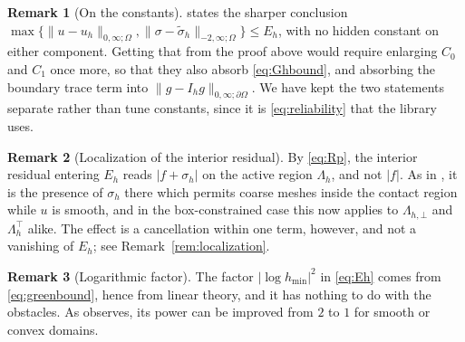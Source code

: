 \documentclass[12pt]{amsart}
\theoremstyle{definition}
\newtheorem{remark}{Remark}
\newcommand{\Om}{\Omega}
\newcommand{\dOm}{\partial\Omega}
\newcommand{\Ih}{I_h}
\newcommand{\Lamh}{\Lambda_h}
\newcommand{\Lamhbot}{\Lambda_{h,\bot}}
\newcommand{\Lamhtop}{\Lambda_h^\top}
\begin{document}
\begin{remark}[On the constants]
\label{rem:constants}
\cite[Theorem 5.4]{NSV03} states the sharper conclusion $\max\{\|u-u_h\|_{0,\infty;\Om},\|\sigma-\tilde\sigma_h\|_{-2,\infty;\Om}\} \le E_h$, with no hidden constant on either component.  Getting that from the proof above would require enlarging $C_0$ and $C_1$ once more, so that they also absorb \eqref{eq:Ghbound}, and absorbing the boundary trace term into $\|g-\Ih g\|_{0,\infty;\dOm}$.  We have kept the two statements separate rather than tune constants, since it is \eqref{eq:reliability} that the library uses.
\end{remark}

\begin{remark}[Localization of the interior residual]
\label{rem:interiorloc}
By \eqref{eq:Rp}, the interior residual entering $E_h$ reads $|f+\sigma_h|$ on the active region $\Lamh$, and not $|f|$.  As in \cite[Remark 5.7]{NSV03}, it is the presence of $\sigma_h$ there which permits coarse meshes inside the contact region while $u$ is smooth, and in the box-constrained case this now applies to $\Lamhbot$ and $\Lamhtop$ alike.  The effect is a cancellation within one term, however, and not a vanishing of $E_h$; see Remark~\ref{rem:localization}.
\end{remark}

\begin{remark}[Logarithmic factor]
\label{rem:logfactor}
The factor $|\log h_{\min}|^2$ in \eqref{eq:Eh} comes from \eqref{eq:greenbound}, hence from linear theory, and it has nothing to do with the obstacles.  As \cite[Remark 5.10]{NSV03} observes, its power can be improved from $2$ to $1$ for smooth or convex domains.
\end{remark}


\end{document}
